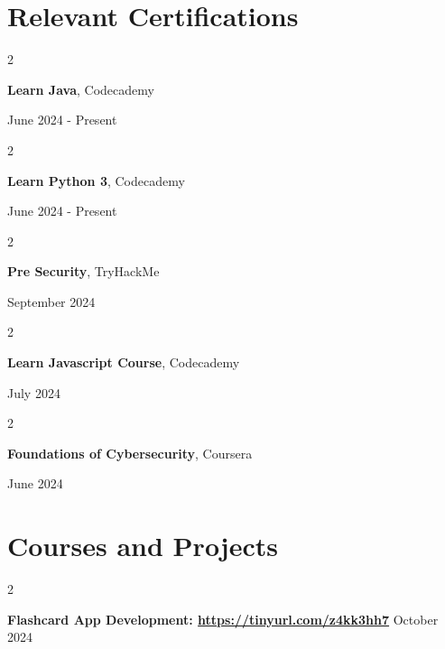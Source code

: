 \documentclass[10pt, letterpaper]{article}
\newenvironment{twocolentry}[2][]{
    \onecolentry
    \def\secondColumn{#2}
    \setcolumnwidth{\fill, 4.5 cm}
    \begin{paracol}{2}
}{
    \switchcolumn \raggedleft \secondColumn
    \end{paracol}
    \endonecolentry
} %
\begin{document}
\section{Relevant Certifications}

    \begin{twocolentry}{
    June 2024 - Present
}
    \textbf{Learn Java}, Codecademy   
\end{twocolentry}

 \vspace{0.05 cm}
     \begin{twocolentry}{
    June 2024 - Present
}
    \textbf{Learn Python 3}, Codecademy   
\end{twocolentry}

 \vspace{0.05 cm}
      \begin{twocolentry}{
    September 2024
}
    \textbf{Pre Security}, TryHackMe
\end{twocolentry}

 \vspace{0.05 cm}

       \begin{twocolentry}{
    July 2024
}
    \textbf{Learn Javascript Course}, Codecademy
\end{twocolentry}

 \vspace{0.05 cm}
       \begin{twocolentry}{
   June 2024
}
    \textbf{Foundations of Cybersecurity}, Coursera
    
\end{twocolentry}

 \vspace{0.05 cm}
        


    
    \section{Courses and Projects}
    \begin{twocolentry}{ October 2024
        }
            \textbf{Flashcard App Development: \href{https://github.com/rw200219/my-intellij-project}{https://tinyurl.com/z4kk3hh7}}\end{twocolentry}
\end{document}
